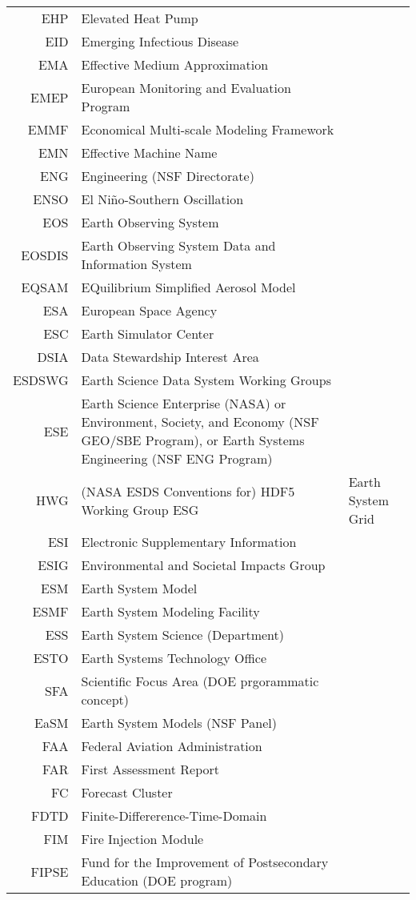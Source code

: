 \documentclass[12pt,twoside]{article}
\begin{document}
\begin{longtable}[>{\bfseries}l]{>{\ttfamily}r l}
EHP & Elevated Heat Pump \\
EID & Emerging Infectious Disease \\
EMA & Effective Medium Approximation \\
EMEP & European Monitoring and Evaluation Program \\
EMMF & Economical Multi-scale Modeling Framework \\
EMN & Effective Machine Name \\
ENG & Engineering (NSF Directorate) \\
ENSO & El Ni\~no-Southern Oscillation \\
EOS & Earth Observing System \\
EOSDIS & Earth Observing System Data and Information System \\
EQSAM & EQuilibrium Simplified Aerosol Model \\
ESA & European Space Agency \\
ESC & Earth Simulator Center \\
DSIA & Data Stewardship Interest Area \\
ESDSWG & Earth Science Data System Working Groups \\
ESE & Earth Science Enterprise (NASA) or Environment, Society, and Economy (NSF GEO/SBE Program), or Earth Systems Engineering (NSF ENG Program) \\
HWG & (NASA ESDS Conventions for) HDF5 Working Group
ESG & Earth System Grid \\
ESI & Electronic Supplementary Information \\
ESIG & Environmental and Societal Impacts Group \\
ESM & Earth System Model \\
ESMF & Earth System Modeling Facility \\
ESS & Earth System Science (Department) \\
ESTO & Earth Systems Technology Office \\
SFA & Scientific Focus Area (DOE prgorammatic concept) \\
EaSM & Earth System Models (NSF Panel) \\
FAA & Federal Aviation Administration \\
FAR & First Assessment Report \\
FC & Forecast Cluster \\
FDTD & Finite-Differerence-Time-Domain \\
FIM & Fire Injection Module \\
FIPSE & Fund for the Improvement of Postsecondary Education (DOE program) \\

\end{longtable}
\end{document}
